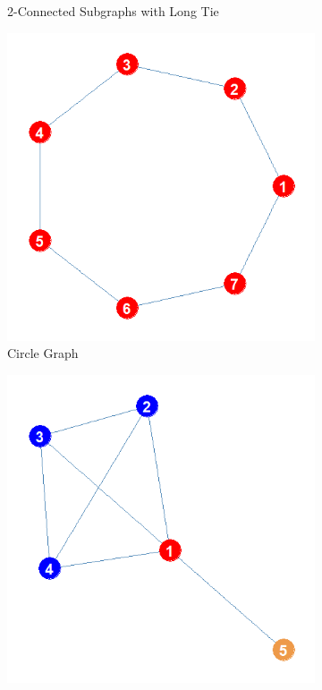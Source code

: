 \documentclass[12pt]{article}
\begin{document}
\begin{figure}
\begin{subfigure}[b]{0.35\textwidth}
            \caption{2-Connected Subgraphs with Long Tie}
            \label{fig:inter}
    \end{subfigure}
    \begin{subfigure}[b]{0.35\textwidth}
        \includegraphics[width=1.0\textwidth]{Plots/circle.png}
            \caption{Circle Graph}
            \label{fig:circle}
    \end{subfigure}
    \begin{subfigure}[b]{0.35\textwidth}
        \includegraphics[width=1.0\textwidth]{Plots/kite.png}

\end{subfigure}
\end{figure}
\end{document}
